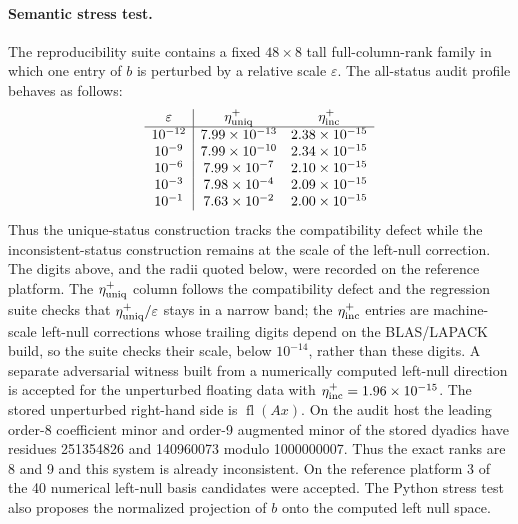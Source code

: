 \documentclass[11pt]{article}
\theoremstyle{definition}
\begin{document}
\paragraph{Semantic stress test.}
The reproducibility suite contains a fixed $48\times8$ tall full-column-rank family in which one entry of $b$ is perturbed by a relative scale $\varepsilon$. The all-status audit profile behaves as follows:
\[
\begin{array}{c|cc}
\varepsilon & \eta_{\rm uniq}^+ & \eta_{\rm inc}^+\\
\hline
10^{-12} & 7.99\times10^{-13} & 2.38\times10^{-15}\\
10^{-9}  & 7.99\times10^{-10} & 2.34\times10^{-15}\\
10^{-6}  & 7.99\times10^{-7}  & 2.10\times10^{-15}\\
10^{-3}  & 7.98\times10^{-4}  & 2.09\times10^{-15}\\
10^{-1}  & 7.63\times10^{-2}  & 2.00\times10^{-15}
\end{array}
\]
Thus the unique-status construction tracks the compatibility defect while the inconsistent-status construction remains at the scale of the left-null correction. The digits above, and the radii quoted below, were recorded on the reference platform. The $\eta_{\rm uniq}^+$ column follows the compatibility defect and the regression suite checks that $\eta_{\rm uniq}^+/\varepsilon$ stays in a narrow band; the $\eta_{\rm inc}^+$ entries are machine-scale left-null corrections whose trailing digits depend on the BLAS/LAPACK build, so the suite checks their scale, below $10^{-14}$, rather than these digits. A separate adversarial witness built from a numerically computed left-null direction is accepted for the unperturbed floating data with $\eta_{\rm inc}^+=1.96\times10^{-15}$. The stored unperturbed right-hand side is $\operatorname{fl}(Ax)$. On the audit host the leading order-8 coefficient minor and order-9 augmented minor of the stored dyadics have residues 251354826 and 140960073 modulo 1000000007. Thus the exact ranks are 8 and 9 and this system is already inconsistent. On the reference platform 3 of the 40 numerical left-null basis candidates were accepted. The Python stress test also proposes the normalized projection of $b$ onto the computed left null space.
\end{document}
